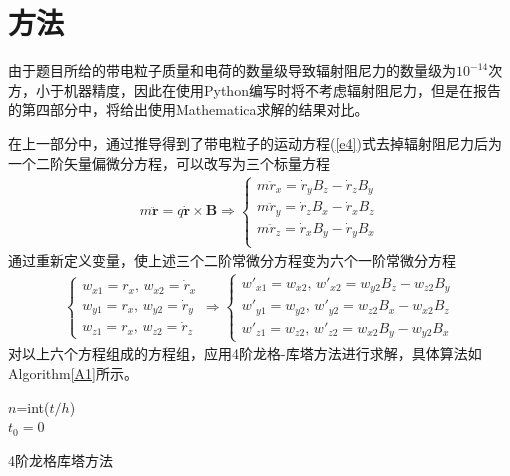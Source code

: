 \documentclass{article} %
\begin{document}
\section{方法}
由于题目所给的带电粒子质量和电荷的数量级导致辐射阻尼力的数量级为$10^{-14}$次方，小于机器精度，因此在使用Python编写时将不考虑辐射阻尼力，但是在报告的第四部分中，将给出使用Mathematica求解的结果对比。

在上一部分中，通过推导得到了带电粒子的运动方程(\ref{e4})式去掉辐射阻尼力后为一个二阶矢量偏微分方程，可以改写为三个标量方程
\begin{align*}
  m\ddot{\pmb{r}}=q\dot{\pmb{r}}\times\pmb{B}\Rightarrow
  \begin{cases}
    m\ddot{r}_x=\dot{r}_y B_z-\dot{r}_z B_y\\
    m\ddot{r}_y=\dot{r}_z B_x-\dot{r}_x B_z\\
    m\ddot{r}_z=\dot{r}_x B_y-\dot{r}_y B_x\\
  \end{cases}
\end{align*}
通过重新定义变量，使上述三个二阶常微分方程变为六个一阶常微分方程
\begin{align}
  \begin{cases}
    w_{x1}=r_x,\, w_{x2}=\dot{r}_x\\
    w_{y1}=r_x,\, w_{y2}=\dot{r}_y\\
    w_{z1}=r_x,\, w_{z2}=\dot{r}_z
  \end{cases}
  \Rightarrow
  \begin{cases}
    w'_{x1}=w_{x2},\, w'_{x2}=w_{y2} B_z-w_{z2} B_y\\
    w'_{y1}=w_{y2},\, w'_{y2}=w_{z2} B_x-w_{x2} B_z\\
    w'_{z1}=w_{z2},\, w'_{z2}=w_{x2} B_y-w_{y2} B_x
  \end{cases}
  \label{e5}
\end{align}
对以上六个方程组成的方程组，应用4阶龙格-库塔方法进行求解，具体算法如Algorithm\ref{A1}所示。
\begin{algorithm}[t]
  \LinesNumbered
  $n$=int($t/h$)\\
  $t_0=0$\\
  \caption{4阶龙格库塔方法}
  \label{A1}
\end{algorithm}
\end{document}
